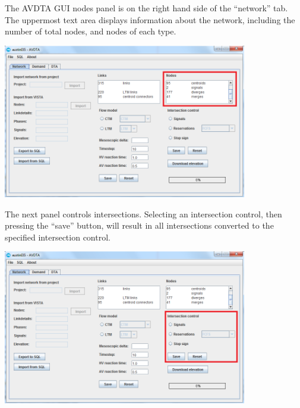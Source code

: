 The AVDTA GUI nodes panel is on the right hand side of the ``network'' tab. The uppermost text area displays information about the network, including the number of total nodes, and nodes of each type.
\begin{center}
\includegraphics[width=0.8\textwidth]{images/nodes1.png}
\end{center}

The next panel controls intersections. Selecting an intersection control, then pressing the ``save'' button, will result in all intersections converted to the specified intersection control.
\begin{center}
\includegraphics[width=0.8\textwidth]{images/nodes2.png}
\end{center}

